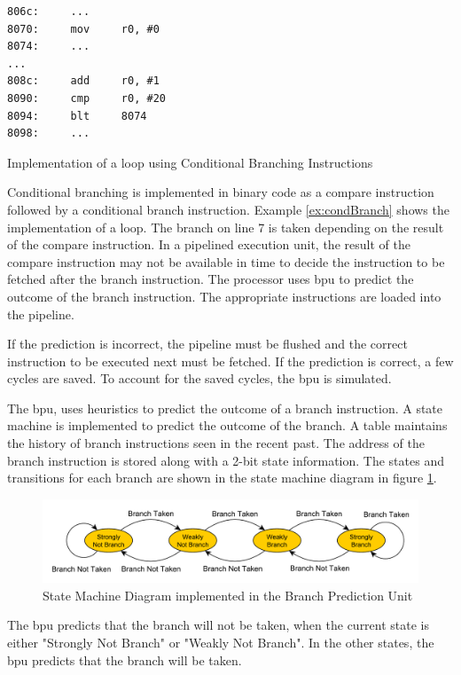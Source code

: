 \begin{Example}[h]
\begin{lstlisting}
806c:     ...
8070:     mov     r0, #0
8074:     ...
...
808c:     add     r0, #1
8090:     cmp     r0, #20
8094:     blt     8074
8098:     ...
\end{lstlisting}
\caption{Implementation of a loop using Conditional Branching Instructions}
\label{ex:condBranch}
\end{Example}

Conditional branching is implemented in binary code as a compare instruction followed by a conditional branch instruction. Example \ref{ex:condBranch} shows the implementation of a loop. The branch on line 7 is taken depending on the result of the compare instruction. In a pipelined execution unit, the result of the compare instruction may not be available in time to decide the instruction to be fetched after the branch instruction. The processor uses \gls{bpu} to predict the outcome of the branch instruction. The appropriate instructions are loaded into the pipeline.

If the prediction is incorrect, the pipeline must be flushed and the correct instruction to be executed next must be fetched. If the prediction is correct, a few cycles are saved. To account for the saved cycles, the \gls{bpu} is simulated.

The \gls{bpu}, uses heuristics to predict the outcome of a branch instruction. A state machine is implemented to predict the outcome of the branch. A table maintains the history of branch instructions seen in the recent past. The address of the branch instruction is stored along with a 2-bit state information. The states and transitions for each branch are shown in the state machine diagram in figure 
\ref{fig:bpuSMD}.

\begin{figure}[h]
\centering
\includegraphics[width=\textwidth]{figures/BranchPredictionSMD.pdf}
\caption{State Machine Diagram implemented in the Branch Prediction Unit}
\label{fig:bpuSMD}
\end{figure}

The \gls{bpu} predicts that the branch will not be taken, when the current state is either "Strongly Not Branch" or "Weakly Not Branch". In the other states, the \gls{bpu} predicts that the branch will be taken.

